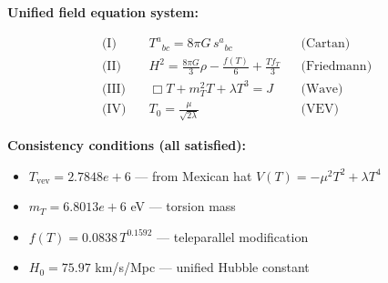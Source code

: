 
\textbf{Unified field equation system:}

\begin{align}
  \text{(I)} \quad & T^a{}_{bc} = 8\pi G \, s^a{}_{bc} && \text{(Cartan)} \\
  \text{(II)} \quad & H^2 = \frac{8\pi G}{3}\rho - \frac{f(T)}{6} + \frac{Tf_T}{3} && \text{(Friedmann)} \\
  \text{(III)} \quad & \Box T + m_T^2 T + \lambda T^3 = J && \text{(Wave)} \\
  \text{(IV)} \quad & T_0 = \frac{\mu}{\sqrt{2\lambda}} && \text{(VEV)}
\end{align}

\textbf{Consistency conditions (all satisfied):}
\begin{itemize}
  \item $T_{\text{vev}} = 2.7848e+6$ — from Mexican hat $V(T) = -\mu^2 T^2 + \lambda T^4$
  \item $m_T = 6.8013e+6$ eV — torsion mass
  \item $f(T) = 0.0838 \, T^{0.1592}$ — teleparallel modification
  \item $H_0 = 75.97$ km/s/Mpc — unified Hubble constant
\end{itemize}